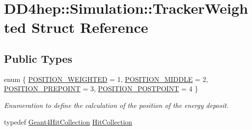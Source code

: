 \hypertarget{struct_d_d4hep_1_1_simulation_1_1_tracker_weighted}{
\section{DD4hep::Simulation::TrackerWeighted Struct Reference}
\label{struct_d_d4hep_1_1_simulation_1_1_tracker_weighted}
}
\subsection*{Public Types}
\begin{DoxyCompactItemize}
\item 
enum \{ \hyperlink{struct_d_d4hep_1_1_simulation_1_1_tracker_weighted_a8cdc474134c1f8b3a8344e32fc3d4421a675d7a02b8891bd8f45bc5f27c5c1746}{POSITION\_\-WEIGHTED} =  1, 
\hyperlink{struct_d_d4hep_1_1_simulation_1_1_tracker_weighted_a8cdc474134c1f8b3a8344e32fc3d4421a4b7f40d92a4823d71b75c6894d032489}{POSITION\_\-MIDDLE} =  2, 
\hyperlink{struct_d_d4hep_1_1_simulation_1_1_tracker_weighted_a8cdc474134c1f8b3a8344e32fc3d4421a1419a617e564f58140744d38381ee4c1}{POSITION\_\-PREPOINT} =  3, 
\hyperlink{struct_d_d4hep_1_1_simulation_1_1_tracker_weighted_a8cdc474134c1f8b3a8344e32fc3d4421ac0ca75f525d337568debb34bf3545e29}{POSITION\_\-POSTPOINT} =  4
 \}
\begin{DoxyCompactList}\small\item\em Enumeration to define the calculation of the position of the energy deposit. \item\end{DoxyCompactList}\item 
typedef \hyperlink{class_d_d4hep_1_1_simulation_1_1_geant4_hit_collection}{Geant4HitCollection} \hyperlink{struct_d_d4hep_1_1_simulation_1_1_tracker_weighted_a99a4be34af7901b0aab7398894ba906a}{HitCollection}
\end{DoxyCompactItemize}

